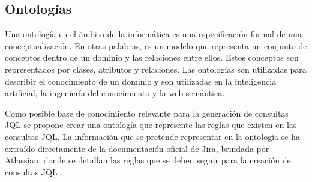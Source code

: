 \subsection{Ontologías}
Una ontología en el ámbito de la informática es una especificación formal de una conceptualización. En otras palabras, es un modelo que representa un conjunto de conceptos dentro de un dominio y las relaciones entre ellos. Estos conceptos son representados por clases, atributos y relaciones. Las ontologías son utilizadas para describir el conocimiento de un dominio y son utilizadas en la inteligencia artificial, la ingeniería del conocimiento y la web semántica.

Como posible base de conocimiento relevante para la generación de consultas JQL se propone crear una ontología que represente las reglas que existen en las consultas JQL. La información que se pretende representar en la ontología se ha extraído directamente de la documentación oficial de Jira, brindada por Atlassian, donde se detallan las reglas que se deben seguir para la creación de consultas JQL \cite{jiradocs}.